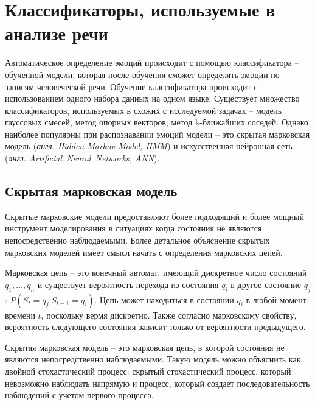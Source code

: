 \section{Классификаторы, используемые в анализе речи}
Автоматическое определение эмоций происходит с помощью классификатора -- обученной модели, которая после обучения сможет определять эмоции по записям человеческой речи. Обучение классификатора происходит с использованием одного набора данных на одном языке. Существует множество классификаторов, используемых в схожих с исследуемой задачах -- модель гауссовых смесей, метод опорных векторов, метод k-ближайших соседей. Однако, наиболее популярны при распознавании эмоций модели -- это скрытая марковская модель (\textit{англ. Hidden Markov Model, HMM}) и искусственная нейронная сеть (\textit{англ. Artificial~Neural~Networks, ANN}).

\subsection{Скрытая марковская модель}

Скрытые марковские модели предоставляют более подходящий и более мощный инструмент моделирования в ситуациях когда состояния не являются непосредственно наблюдаемыми. Более детальное объяснение скрытых марковских моделей имеет смысл начать с определения марковских цепей.

Марковская цепь -- это конечный автомат, имеющий дискретное число состояний $q_1, \dots, q_n$ и существует вероятность перехода из состояния $q_i$ в другое состояние $q_j$: $P\left(S_t = q_j | S_{t - 1} = q_i\right)$. Цепь может находиться в состоянии $q_i$ в любой момент времени $t$, поскольку вермя дискретно. Также согласно марковскому свойству, вероятность следующего состояния зависит только от вероятности предыдущего.

Скрытая марковская модель -- это марковская цепь, в которой состояния не являются непосредственно наблюдаемыми. Такую модель можно объяснить как двойной  стохастический процесс: скрытый стохастический процесс, который невозможно наблюдать напрямую и процесс, который создает последовательность наблюдений с учетом первого процесса.


